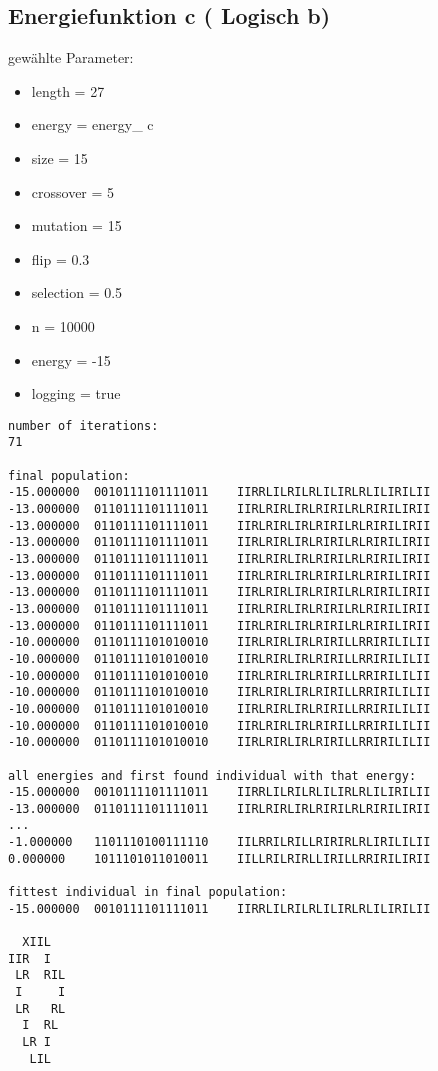 \documentclass[a4paper,10pt,fleqn]{scrartcl}
\begin{document}
\subsection{Energiefunktion c ( Logisch b)} 
gewählte Parameter:
\begin{itemize}
\item length = 27
\item energy = energy\_ c
\item size = 15
\item crossover = 5
\item mutation = 15
\item flip = 0.3
\item selection =  0.5
\item n = 10000
\item energy = -15
\item logging = true
\end{itemize}
\begin{lstlisting}
number of iterations:
71

final population:
-15.000000	0010111101111011	IIRRLILRILRLILIRLRLILIRILII
-13.000000	0110111101111011	IIRLRIRLIRLRIRILRLRIRILIRII
-13.000000	0110111101111011	IIRLRIRLIRLRIRILRLRIRILIRII
-13.000000	0110111101111011	IIRLRIRLIRLRIRILRLRIRILIRII
-13.000000	0110111101111011	IIRLRIRLIRLRIRILRLRIRILIRII
-13.000000	0110111101111011	IIRLRIRLIRLRIRILRLRIRILIRII
-13.000000	0110111101111011	IIRLRIRLIRLRIRILRLRIRILIRII
-13.000000	0110111101111011	IIRLRIRLIRLRIRILRLRIRILIRII
-13.000000	0110111101111011	IIRLRIRLIRLRIRILRLRIRILIRII
-10.000000	0110111101010010	IIRLRIRLIRLRIRILLRRIRILILII
-10.000000	0110111101010010	IIRLRIRLIRLRIRILLRRIRILILII
-10.000000	0110111101010010	IIRLRIRLIRLRIRILLRRIRILILII
-10.000000	0110111101010010	IIRLRIRLIRLRIRILLRRIRILILII
-10.000000	0110111101010010	IIRLRIRLIRLRIRILLRRIRILILII
-10.000000	0110111101010010	IIRLRIRLIRLRIRILLRRIRILILII
-10.000000	0110111101010010	IIRLRIRLIRLRIRILLRRIRILILII

all energies and first found individual with that energy:
-15.000000	0010111101111011	IIRRLILRILRLILIRLRLILIRILII
-13.000000	0110111101111011	IIRLRIRLIRLRIRILRLRIRILIRII
...
-1.000000	1101110100111110	IILRRILRILLRIRIRLRLIRILILII
0.000000	1011101011010011	IILLRILRIRLLIRILLRRIRILIRII

fittest individual in final population:
-15.000000	0010111101111011	IIRRLILRILRLILIRLRLILIRILII

  XIIL  
IIR  I  
 LR  RIL
 I     I
 LR   RL
  I  RL 
  LR I  
   LIL  
\end{lstlisting}
\end{document}
